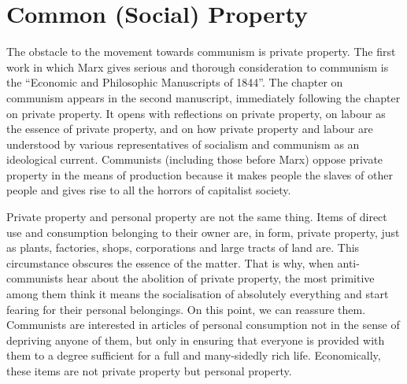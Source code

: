\documentclass[../main]{subfiles}
\begin{document}
\ifSubfilesClassLoaded{\setcounter{page}{27}}{}
\section{Common (Social) Property}
\label{sec:05_common_property}

The obstacle to the movement towards communism is private property. The first work in which Marx gives serious and thorough consideration to communism is the “Economic and Philosophic Manuscripts of 1844”. The chapter on communism appears in the second manuscript, immediately following the chapter on private property. It opens with reflections on private property, on labour as the essence of private property, and on how private property and labour are understood by various representatives of socialism and communism as an ideological current. Communists (including those before Marx) oppose private property in the means of production because it makes people the slaves of other people and gives rise to all the horrors of capitalist society.

Private property and personal property are not the same thing. Items of direct use and consumption belonging to their owner are, in form, private property, just as plants, factories, shops, corporations and large tracts of land are. This circumstance obscures the essence of the matter. That is why, when anti-communists hear about the abolition of private property, the most primitive among them think it means the socialisation of absolutely everything and start fearing for their personal belongings. On this point, we can reassure them. Communists are interested in articles of personal consumption not in the sense of depriving anyone of them, but only in ensuring that everyone is provided with them to a degree sufficient for a full and many-sidedly rich life. Economically, these items are not private property but personal property.
\end{document}
